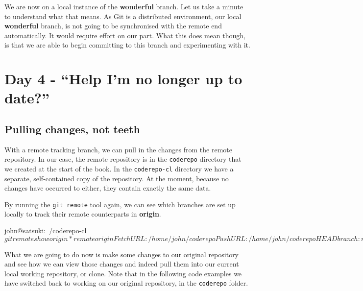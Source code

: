 We are now on a local instance of the \textbf{wonderful} branch.
Let us take a minute to understand what that means.
As Git is a distributed environment, our local \textbf{wonderful} branch, is not going to be synchronised with the remote end automatically.
It would require effort on our part.
What this does mean though, is that we are able to begin committing to this branch and experimenting with it.

\section{Day 4 - ``Help I'm no longer up to date?''}
\subsection{Pulling changes, not teeth}
With a remote tracking branch, we can pull in the changes from the remote repository.
In our case, the remote repository is in the \texttt{coderepo} directory that we created at the start of the book.
In the \texttt{coderepo-cl} directory we have a separate, self-contained copy of the repository.
At the moment, because no changes have occurred to either, they contain exactly the same data.

By running the \texttt{git remote} tool again, we can see which branches are set up locally to track their remote counterparts in \textbf{origin}.

\begin{code}
john@satsuki:~/coderepo-cl$ git remote show origin
* remote origin
  Fetch URL: /home/john/coderepo
  Push  URL: /home/john/coderepo
  HEAD branch: master
  Remote branches:
    master    tracked
    wonderful tracked
    zaney     tracked
  Local branches configured for 'git pull':
    master    merges with remote master
    wonderful merges with remote wonderful
  Local refs configured for 'git push':
    master    pushes to master    (up to date)
    wonderful pushes to wonderful (up to date)
john@satsuki:~/coderepo-cl$
\end{code}

What we are going to do now is make some changes to our original repository and see how we can view those changes and indeed pull them into our current local working repository, or clone.
Note that in the following code examples we have switched back to working on our original repository, in the \texttt{coderepo} folder.

